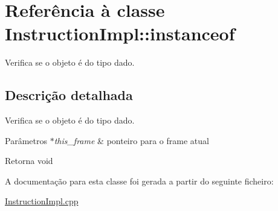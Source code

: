 \hypertarget{class_instruction_impl_1_1instanceof}{}\section{Referência à classe Instruction\+Impl\+:\+:instanceof}
\label{class_instruction_impl_1_1instanceof}


Verifica se o objeto é do tipo dado.  




\subsection{Descrição detalhada}
Verifica se o objeto é do tipo dado. 


\begin{DoxyParams}{Parâmetros}
{\em $\ast$this\+\_\+frame} & ponteiro para o frame atual \\
\hline
\end{DoxyParams}
\begin{DoxyReturn}{Retorna}
void 
\end{DoxyReturn}


A documentação para esta classe foi gerada a partir do seguinte ficheiro\+:\begin{DoxyCompactItemize}
\item 
\hyperlink{_instruction_impl_8cpp}{Instruction\+Impl.\+cpp}\end{DoxyCompactItemize}
